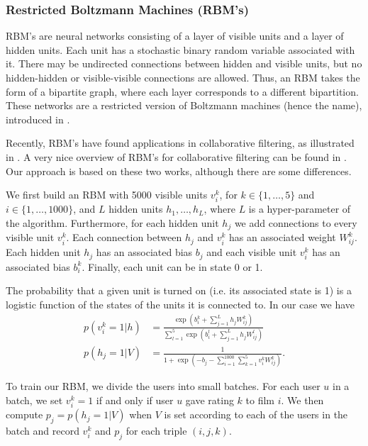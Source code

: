 \documentclass[10pt,conference,compsocconf]{IEEEtran}
\begin{document}
\subsubsection*{\textbf{Restricted Boltzmann Machines (RBM's)}}

RBM's are neural networks consisting of a layer of visible units and a layer of hidden units. Each unit has a stochastic binary random variable associated with it. There may be undirected connections between hidden and visible units, but no hidden-hidden or visible-visible connections are allowed. Thus, an RBM takes the form of a bipartite graph, where each layer corresponds to a different bipartition. These networks are a restricted version of Boltzmann machines (hence the name), introduced in \cite{AHS85}.

Recently, RBM's have found applications in collaborative filtering, as illustrated in \cite{SMH07}. A very nice overview of RBM's for collaborative filtering can be found in \cite{L10}. Our approach is based on these two works, although there are some differences.

We first build an RBM with 5000 visible units $v^k_i$, for $k\in\{1,\dots,5\}$ and $i\in\{1,\dots,1000\}$, and $L$ hidden units $h_1,\dots, h_L$, where $L$ is a hyper-parameter of the algorithm. Furthermore, for each hidden unit $h_j$ we add connections to every visible unit $v^k_i$. Each connection between $h_j$ and $v^k_i$ has an associated weight $W^k_{ij}$. Each hidden unit $h_j$ has an associated bias $b_j$ and each visible unit $v^k_i$ has an associated bias $b^k_i$. Finally, each unit can be in state 0 or 1.

The probability that a given unit is turned on (i.e. its associated state is 1) is a logistic function of the states of the units it is connected to. In our case we have
\begin{equation}
\begin{split}
	p(v^k_i=1|h)&=\frac{\exp(b^k_i+\sum_{j=1}^L h_jW^k_{ij})}{\sum_{l=1}^{5}\exp(b^l_i+\sum_{j=1}^{L}h_jW^l_{ij})}\\
	p(h_j=1|V)&=\frac{1}{1+\exp(-b_j-\sum_{i=1}^{1000}\sum_{k=1}^{5}v^k_iW^k_{ij})}.
\end{split}
\end{equation}

To train our RBM, we divide the users into small batches. For each user $u$ in a batch, we set $v^k_i=1$ if and only if user $u$ gave rating $k$ to film $i$. We then compute $p_j=p(h_j=1|V)$ when $V$ is set according to each of the users in the batch and record $v^k_i$ and $p_j$ for each triple $(i,j,k)$.
\end{document}
